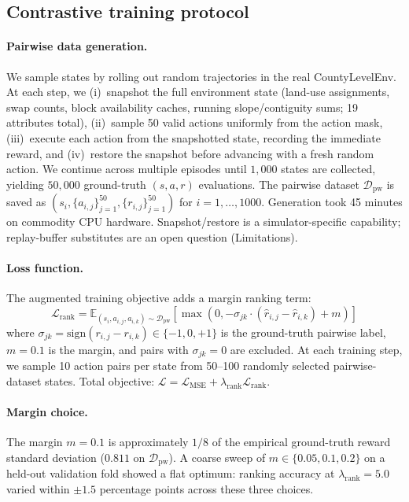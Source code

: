 \documentclass[11pt]{article}
\begin{document}
\subsection*{Contrastive training protocol}\label{sec:methods-contrastive}

\paragraph{Pairwise data generation.} We sample states by rolling out random trajectories in the real CountyLevelEnv. At each step, we (i)~snapshot the full environment state (land-use assignments, swap counts, block availability caches, running slope/contiguity sums; 19 attributes total), (ii)~sample 50 valid actions uniformly from the action mask, (iii)~execute each action from the snapshotted state, recording the immediate reward, and (iv)~restore the snapshot before advancing with a fresh random action. We continue across multiple episodes until $1{,}000$ states are collected, yielding $50{,}000$ ground-truth $(s, a, r)$ evaluations. The pairwise dataset $\mathcal{D}_{\text{pw}}$ is saved as $(s_i, \{a_{i,j}\}_{j=1}^{50}, \{r_{i,j}\}_{j=1}^{50})$ for $i = 1, \ldots, 1000$. Generation took 45 minutes on commodity CPU hardware. Snapshot/restore is a simulator-specific capability; replay-buffer substitutes are an open question (Limitations).

\paragraph{Loss function.} The augmented training objective adds a margin ranking term:
\begin{equation*}
\mathcal{L}_{\text{rank}} = \mathbb{E}_{(s_i, a_{i,j}, a_{i,k}) \sim \mathcal{D}_{\text{pw}}} \left[ \max\left(0, -\sigma_{jk} \cdot (\hat{r}_{i,j} - \hat{r}_{i,k}) + m\right) \right]
\end{equation*}
where $\sigma_{jk} = \text{sign}(r_{i,j} - r_{i,k}) \in \{-1, 0, +1\}$ is the ground-truth pairwise label, $m = 0.1$ is the margin, and pairs with $\sigma_{jk} = 0$ are excluded. At each training step, we sample 10 action pairs per state from 50--100 randomly selected pairwise-dataset states. Total objective: $\mathcal{L} = \mathcal{L}_{\text{MSE}} + \lambda_{\text{rank}} \mathcal{L}_{\text{rank}}$.

\paragraph{Margin choice.} The margin $m = 0.1$ is approximately $1/8$ of the empirical ground-truth reward standard deviation ($0.811$ on $\mathcal{D}_{\text{pw}}$). A coarse sweep of $m \in \{0.05, 0.1, 0.2\}$ on a held-out validation fold showed a flat optimum: ranking accuracy at $\lambda_{\text{rank}}{=}5.0$ varied within $\pm 1.5$ percentage points across these three choices.
\end{document}
